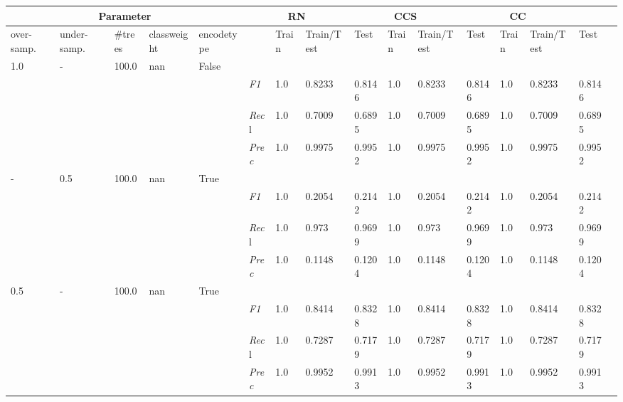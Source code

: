 \begin{table}[]
    \tiny
    \tabcolsep=0.11cm
    \begin{tabularx}{\textwidth}{XXXXX|X|XXX|XXX|XXXX}
    \toprule
    \multicolumn{5}{c}{Parameter} & \multicolumn{3}{c}{RN} & \multicolumn{3}{c}{CCS} & \multicolumn{3}{c}{CC} \\ \midrule
    over-\newline samp. & under-\newline samp. & \#trees & class\newline weight & encode\newline type & & Train & Train/\newline Test & Test & Train & Train/\newline Test & Test & Train & Train/\newline Test & Test \\ \midrule
    1.0 & - & 100.0 & nan & False& & & & & & & & & \\
    & & & & & \textit{F1} & 1.0 & 0.8233 & 0.8146 & 1.0 & 0.8233        & 0.8146        & 1.0        & 0.8233        & 0.8146        \\
    & & & & & \textit{Rec}l & 1.0 & 0.7009 & 0.6895    & 1.0 & 0.7009    & 0.6895    & 1.0    & 0.7009    & 0.6895    \\
    & & & & & \textit{Prec} & 1.0 & 0.9975 & 0.9952 & 1.0 & 0.9975 & 0.9952 & 1.0 & 0.9975 & 0.9952 \\ \midrule
    - & 0.5 & 100.0 & nan & True& & & & & & & & & \\
    & & & & & \textit{F1} & 1.0 & 0.2054 & 0.2142 & 1.0 & 0.2054        & 0.2142        & 1.0        & 0.2054        & 0.2142        \\
    & & & & & \textit{Rec}l & 1.0 & 0.973 & 0.9699    & 1.0 & 0.973    & 0.9699    & 1.0    & 0.973    & 0.9699    \\
    & & & & & \textit{Prec} & 1.0 & 0.1148 & 0.1204 & 1.0 & 0.1148 & 0.1204 & 1.0 & 0.1148 & 0.1204 \\ \midrule
    0.5 & - & 100.0 & nan & True& & & & & & & & & \\
    & & & & & \textit{F1} & 1.0 & 0.8414 & 0.8328 & 1.0 & 0.8414        & 0.8328        & 1.0        & 0.8414        & 0.8328        \\
    & & & & & \textit{Rec}l & 1.0 & 0.7287 & 0.7179    & 1.0 & 0.7287    & 0.7179    & 1.0    & 0.7287    & 0.7179    \\
    & & & & & \textit{Prec} & 1.0 & 0.9952 & 0.9913 & 1.0 & 0.9952 & 0.9913 & 1.0 & 0.9952 & 0.9913 \\ \midrule

\end{tabularx}
\end{table}
